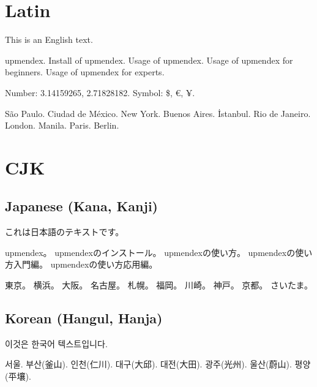 \documentclass[a4paper]{article}
\begin{document}
\section{Latin}
This is an English text.

upmendex.
Install of upmendex.
Usage of upmendex.
Usage of upmendex for beginners.
Usage of upmendex for experts.

Number: 3.14159265, 2.71828182.
Symbol: \$\index{\$}, €, ¥.

São Paulo.
Ciudad de México.
New York.
Buenos Aires.
İstanbul.
Rio de Janeiro.
London.
Manila.
Paris.
Berlin.

\section{CJK}
\subsection{Japanese (Kana, Kanji)}
\begin{japanese}
これは日本語のテキストです。

upmendex。
upmendexのインストール。
upmendexの使い方。
upmendexの使い方入門編。
upmendexの使い方応用編。

東京。
横浜。
大阪。
名古屋。
札幌。
福岡。
川崎。
神戸。
京都。
さいたま。
\end{japanese}

\subsection{Korean (Hangul, Hanja)}
\begin{korean}
이것은 한국어 텍스트입니다.

서울.
부산(釜山).
인천(仁川).
대구(大邱).
대전(大田).
광주(光州).
울산(蔚山).
평양(平壤).
\end{korean}
\end{document}
